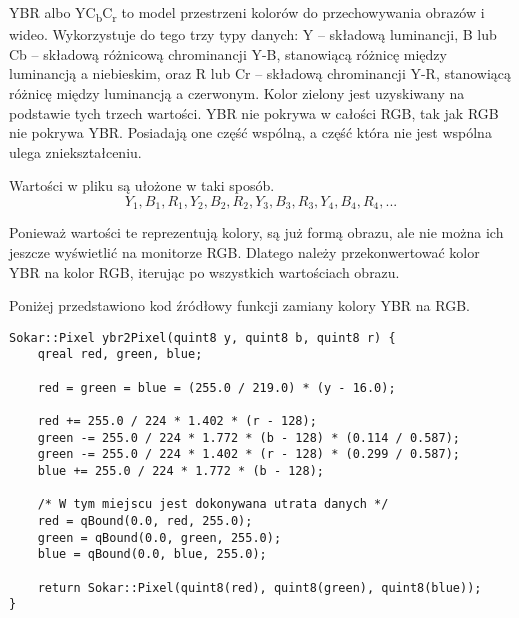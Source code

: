 \label{sec:algorithm-pixmap-ybr}

\par
YBR albo YC\textsubscript{b}C\textsubscript{r} to model przestrzeni kolorów do przechowywania obrazów i wideo.
Wykorzystuje do tego trzy typy danych: Y – składową luminancji, B lub Cb – składową różnicową chrominancji Y-B, stanowiącą różnicę między luminancją a niebieskim, oraz R lub Cr – składową chrominancji Y-R, stanowiącą różnicę między luminancją a czerwonym.
Kolor zielony jest uzyskiwany na podstawie tych trzech wartości.
YBR nie pokrywa w całości RGB, tak jak RGB nie pokrywa YBR.
Posiadają one część wspólną, a część która nie jest wspólna ulega zniekształceniu.

\par
Wartości w pliku \DICOM są ułożone w taki sposób.
\[Y_1, B_1, R_1, Y_2, B_2, R_2, Y_3, B_3, R_3, Y_4, B_4, R_4,  ...\]

\par
Ponieważ wartości te reprezentują kolory, są już formą obrazu, ale nie można ich jeszcze wyświetlić na monitorze RGB.
Dlatego należy przekonwertować kolor YBR na kolor RGB, iterując po wszystkich wartościach obrazu.

\par
Poniżej przedstawiono kod źródłowy funkcji zamiany kolory YBR na RGB.

\begin{lstlisting}
Sokar::Pixel ybr2Pixel(quint8 y, quint8 b, quint8 r) {
    qreal red, green, blue;

    red = green = blue = (255.0 / 219.0) * (y - 16.0);

    red += 255.0 / 224 * 1.402 * (r - 128);
    green -= 255.0 / 224 * 1.772 * (b - 128) * (0.114 / 0.587);
    green -= 255.0 / 224 * 1.402 * (r - 128) * (0.299 / 0.587);
    blue += 255.0 / 224 * 1.772 * (b - 128);

    /* W tym miejscu jest dokonywana utrata danych */
    red = qBound(0.0, red, 255.0);
    green = qBound(0.0, green, 255.0);
    blue = qBound(0.0, blue, 255.0);

    return Sokar::Pixel(quint8(red), quint8(green), quint8(blue));
}
\end{lstlisting}